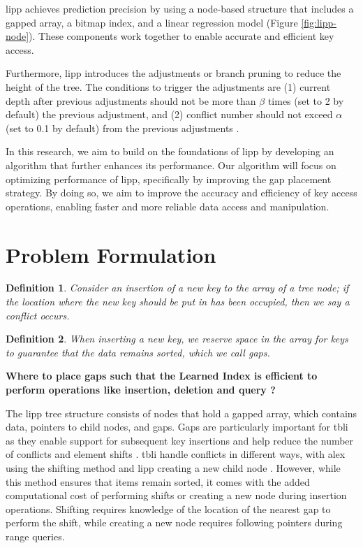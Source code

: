 \documentclass[11pt,a4paper]{article}
\newtheorem{definition}{Definition}
\newcommand{\conflict}{\textsf{conflict}\xspace}
\begin{document}
\acrshort{lipp} achieves prediction precision by using a node-based structure that includes a gapped array, a bitmap index, and a linear regression model (Figure \ref{fig:lipp-node}). These components work together to enable accurate and efficient key access.

Furthermore, \acrshort{lipp} introduces the adjustments or branch pruning to reduce the height of the tree. The conditions to trigger the adjustments are (1) current depth after previous adjustments should not be more than $\beta$ times (set to 2 by default) the previous adjustment, and (2) \conflict number should not exceed $\alpha$ (set to 0.1 by default) from the previous adjustments \cite{LIPP}. 

In this research, we aim to build on the foundations of \acrshort{lipp} by developing an algorithm that further enhances its performance. Our algorithm will focus on optimizing performance of \acrshort{lipp}, specifically by improving the gap placement strategy. By doing so, we aim to improve the accuracy and efficiency of key access operations, enabling faster and more reliable data access and manipulation.



\section{Problem Formulation}
\begin{definition}
 Consider an insertion of a new key to the array of a tree node; if the location where the new key should be put in has been occupied, then we say a \emph{conflict} occurs.
\label{def:conflict}
\end{definition}
\begin{definition}
When inserting a new key, we reserve space in the array for keys to guarantee that the data remains sorted, which we call \emph{gaps}.  
\label{def:gap}
\end{definition}

\textbf{Where to place gaps such that the Learned Index is efficient to perform operations like insertion, deletion and query ?}
 
 The \acrfull{lipp} tree structure consists of nodes that hold a gapped array, which contains data, pointers to child nodes, and gaps. Gaps are particularly important for \acrfull{tbli} as they enable support for subsequent key insertions and help reduce the number of conflicts and element shifts \cite{ALEX,PGM,fittingtree,LIPP}. \acrshort{tbli} handle conflicts in different ways, with \acrshort{alex} using the shifting method \cite{ALEX} and \acrshort{lipp} creating a new child node \cite{LIPP}. However, while this method ensures that items remain sorted, it comes with the added computational cost of performing shifts or creating a new node during insertion operations. Shifting requires knowledge of the location of the nearest gap to perform the shift, while creating a new node requires following pointers during range queries.
\end{document}
